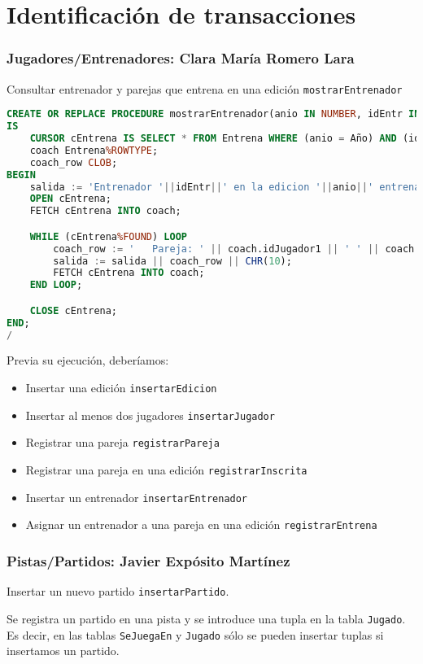 \section{Identificación de transacciones}
\subsubsection{Jugadores/Entrenadores: Clara María Romero Lara}
Consultar entrenador y parejas que entrena en una edición \texttt{mostrarEntrenador}

\begin{lstlisting}[language=sql]
CREATE OR REPLACE PROCEDURE mostrarEntrenador(anio IN NUMBER, idEntr IN NUMBER, salida OUT CLOB)
IS
	CURSOR cEntrena IS SELECT * FROM Entrena WHERE (anio = Año) AND (idEntr=idEntrenador);
	coach Entrena%ROWTYPE;
	coach_row CLOB;
BEGIN
	salida := 'Entrenador '||idEntr||' en la edicion '||anio||' entrena:'||CHR(10);
	OPEN cEntrena;
	FETCH cEntrena INTO coach;

	WHILE (cEntrena%FOUND) LOOP
		coach_row := '   Pareja: ' || coach.idJugador1 || ' ' || coach.idJugador2;
		salida := salida || coach_row || CHR(10);
		FETCH cEntrena INTO coach;
	END LOOP;

	CLOSE cEntrena;
END;
/
\end{lstlisting}

Previa su ejecución, deberíamos:
\begin{itemize}
	\item Insertar una edición \texttt{insertarEdicion}
	\item Insertar al menos dos jugadores \texttt{insertarJugador}
	\item Registrar una pareja \texttt{registrarPareja}
	\item Registrar una pareja en una edición \texttt{registrarInscrita}
	\item Insertar un entrenador \texttt{insertarEntrenador}
	\item Asignar un entrenador a una pareja en una edición \texttt{registrarEntrena}
\end{itemize}

\subsubsection{Pistas/Partidos: Javier Expósito Martínez}
Insertar un nuevo partido \texttt{insertarPartido}.

Se registra un partido en una pista y se introduce una tupla en la tabla \texttt{Jugado}. Es decir, en las tablas \texttt{SeJuegaEn} y \texttt{Jugado}
sólo se pueden insertar tuplas si insertamos un partido.

